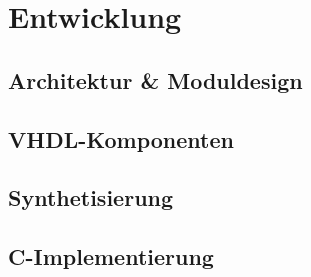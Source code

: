 
\chapter{Entwicklung} \label{sec:entwicklung}

\section{Architektur \& Moduldesign}



\section{VHDL-Komponenten}







\section{Synthetisierung}


\section{C-Implementierung} 



